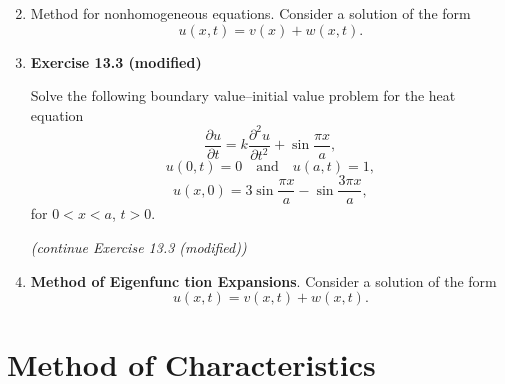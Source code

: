 \begin{enumerate}

\setcounter{enumi}{1}

\item Method for nonhomogeneous equations. Consider a solution of the form
\[u(x,t)=v(x)+w(x,t).\]



\item \textbf{Exercise 13.3 (modified)}

Solve the following boundary value--initial value problem for the heat equation
\[\frac{\partial u}{\partial t}= k\frac{\partial ^{2}u}{\partial t^{2}}+
\sin\frac{\pi x}{a},\]
\[u(0,t)=0 \quad \text{and} \quad u(a,t)=1,\]
\[u(x,0)=3\sin\frac{\pi x}{a} -\sin \frac{3\pi x}{a},\]
for $0<x<a$, $t>0$.


\newpage

\textit{(continue Exercise 13.3 (modified))}

\vfill


\item \textbf{Method of Eigenfunc tion Expansions}. Consider a solution of the form
\[u(x,t)=v(x,t)+w(x,t).\]


\vspace{100pt}


\end{enumerate}

\newpage

\section{Method of Characteristics}



